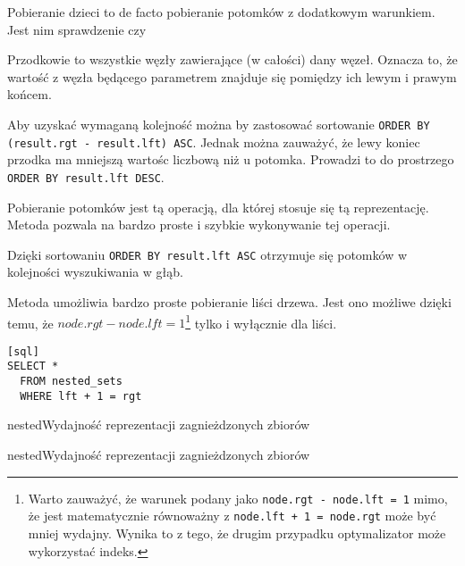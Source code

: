 
Pobieranie dzieci to de facto pobieranie potomków z dodatkowym warunkiem.
Jest nim sprawdzenie czy 






Przodkowie to wszystkie węzły zawierające (w całości) dany węzeł.
Oznacza to, że wartość z węzła będącego parametrem znajduje się pomiędzy ich lewym i prawym końcem. 



Aby uzyskać wymaganą kolejność można by zastosować sortowanie \texttt{ORDER BY (result.rgt - result.lft) ASC}.
Jednak można zauważyć, że lewy koniec przodka ma mniejszą wartośc liczbową niż u potomka.
Prowadzi to do prostrzego \texttt{ORDER BY result.lft DESC}.


Pobieranie potomków jest tą operacją, dla której stosuje się tą reprezentację.
Metoda pozwala na bardzo proste i szybkie wykonywanie tej operacji.


Dzięki sortowaniu \texttt{ORDER BY result.lft ASC} otrzymuje się potomków w kolejności wyszukiwania w głąb.



Metoda umożliwia bardzo proste pobieranie liści drzewa.
Jest ono możliwe dzięki temu, że $node.rgt - node.lft = 1$\footnote{
    Warto zauważyć, że warunek podany jako \texttt{node.rgt - node.lft = 1} mimo,
    że jest matematycznie równoważny z \texttt{node.lft + 1 = node.rgt} może być mniej wydajny.
    Wynika to z tego, że drugim przypadku optymalizator może wykorzystać indeks.
}
tylko i wyłącznie dla liści. 
\begin{verbatim}[sql]
SELECT *
  FROM nested_sets
  WHERE lft + 1 = rgt
\end{verbatim}





\begin{qxtab}{nested}{Wydajność reprezentacji zagnieżdzonych zbiorów}
\end{qxtab}

\begin{qxfig}{nested}{Wydajność reprezentacji zagnieżdzonych zbiorów}
\end{qxfig}

